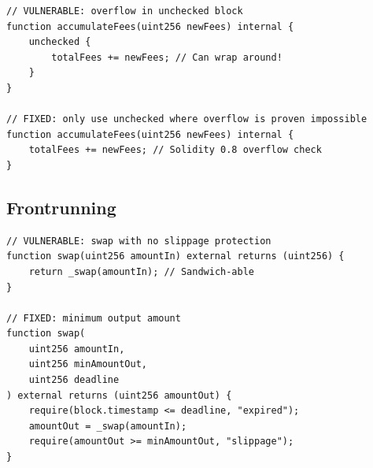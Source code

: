 \begin{lstlisting}[language=Solidity,caption={Overflow in unchecked block}]
// VULNERABLE: overflow in unchecked block
function accumulateFees(uint256 newFees) internal {
    unchecked {
        totalFees += newFees; // Can wrap around!
    }
}

// FIXED: only use unchecked where overflow is proven impossible
function accumulateFees(uint256 newFees) internal {
    totalFees += newFees; // Solidity 0.8 overflow check
}
\end{lstlisting}

\subsection{Frontrunning}

\begin{lstlisting}[language=Solidity,caption={Frontrunning defense with commit-reveal}]
// VULNERABLE: swap with no slippage protection
function swap(uint256 amountIn) external returns (uint256) {
    return _swap(amountIn); // Sandwich-able
}

// FIXED: minimum output amount
function swap(
    uint256 amountIn,
    uint256 minAmountOut,
    uint256 deadline
) external returns (uint256 amountOut) {
    require(block.timestamp <= deadline, "expired");
    amountOut = _swap(amountIn);
    require(amountOut >= minAmountOut, "slippage");
}
\end{lstlisting}

